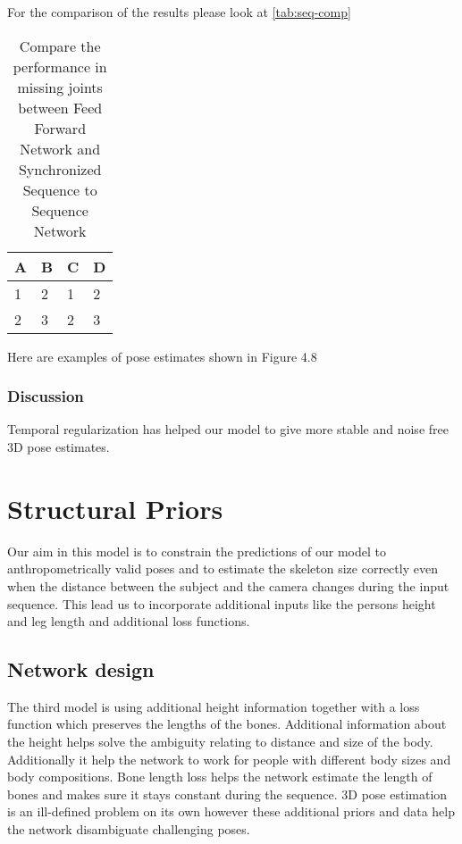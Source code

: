 For the comparison of the results please look at \autoref{tab:seq-comp}

\begin{table}[htpb]
    \centering
    \begin{tabular}{l l l l}
        \toprule
            A & B & C & D \\
        \midrule
            1 & 2 & 1 & 2 \\
            2 & 3 & 2 & 3 \\
        \bottomrule
    \end{tabular}
    \caption[Comparison Synchronized Sequence to Sequence Network]{Compare the performance in missing joints between Feed Forward Network and Synchronized Sequence to Sequence Network}\label{tab:seq-comp}
\end{table}


Here are examples of pose estimates shown in Figure 4.8

\subsubsection{Discussion}

Temporal regularization has helped our model to give more stable and noise free 3D pose estimates.


\section{Structural Priors}

Our aim in this model is to constrain the predictions of our model to anthropometrically valid poses and to estimate the skeleton size correctly even when the distance between the subject and the camera changes during the input sequence. This lead us to incorporate additional inputs like the persons height and leg length and additional loss functions.

\subsection{Network design}

The third model is using additional height information together with a loss function which preserves the lengths of the bones. Additional information about the height helps solve the ambiguity relating to distance and size of the body. Additionally it help the network to work for people with different body sizes and body compositions. Bone length loss helps the network estimate the length of bones and makes sure it stays constant during the sequence. 3D pose estimation is an ill-defined problem on its own however these additional priors and data help the network disambiguate challenging poses.

